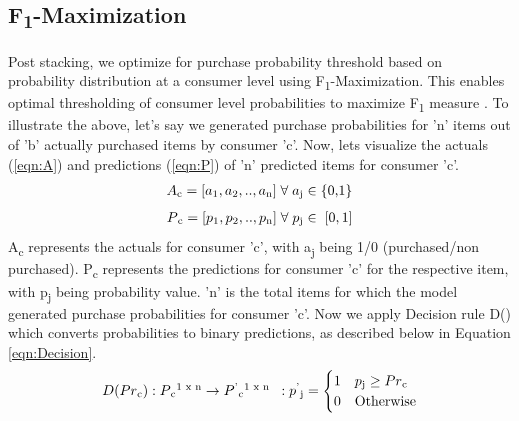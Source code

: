 \subsection{F\textsubscript{1}-Maximization}
Post stacking, we optimize for purchase probability threshold based on
probability distribution at a consumer level using F\textsubscript{1}-Maximization.
This enables optimal thresholding of consumer level probabilities to  maximize F\textsubscript{1} measure \cite{lipton2014optimal}.
To illustrate the above, let's say we generated purchase probabilities for 
'n' items out of 'b' actually purchased items by consumer 'c'. Now, lets visualize the actuals (\ref{eqn:A}) 
and predictions (\ref{eqn:P})  of 'n' predicted items for consumer 'c'.
  \begin{equation}
    \begin{array}{l}
      A\textsubscript{c} = [a\textsubscript{1}, a\textsubscript{2}, .., a\textsubscript{n}] 
       \; \forall \; a\textsubscript{j} \in \; $\{0,1\}$
    \end{array}
    \label{eqn:A}
  \end{equation}
  \begin{equation}
    \begin{array}{l}
      P\textsubscript{c} = [p\textsubscript{1}, p\textsubscript{2}, .., p\textsubscript{n}]
      \; \forall \; p\textsubscript{j} \in \; [0,1]
    \end{array}
    \label{eqn:P}
  \end{equation}
A\textsubscript{c} represents the actuals for consumer 'c', with a\textsubscript{j} being 1/0 
(purchased/non purchased). P\textsubscript{c} represents the predictions 
for consumer 'c' for the respective item, with p\textsubscript{j} being probability value. 
'n' is the total items for which the model generated purchase probabilities for consumer 'c'.
Now we apply Decision rule D() which converts probabilities to binary predictions, as described below 
in Equation \ref{eqn:Decision}.
  \begin{equation}
    \begin{array}{l}
      D(Pr\textsubscript{c}) : P\textsubscript{c}\textsuperscript{1 x n}
      \to P\textsuperscript{'}\textsubscript{c}\textsuperscript{1 x n}
      \;\; : p\textsuperscript{'}\textsubscript{j} = 
        \begin{cases}
          1 & p\textsubscript{j} \geq Pr\textsubscript{c} \\
          0 & \text{Otherwise}
        \end{cases}
    \end{array}
    \label{eqn:Decision}
  \end{equation}
